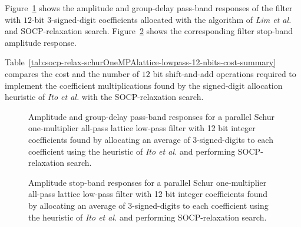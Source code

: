 \documentclass[a4paper,twoside,10pt,english]{report}
\begin{document}
Figure~\ref{fig:socp-relax-schurOneMPAlattice-lowpass-12-nbits-pass-response}
shows the amplitude and group-delay pass-band responses of the filter with
$12$-bit $3$-signed-digit coefficients allocated with the algorithm of
\emph{Lim et al.} and SOCP-relaxation search.
Figure~\ref{fig:socp-relax-schurOneMPAlattice-lowpass-12-nbits-stop-response}
shows the corresponding filter stop-band amplitude response.
\begin{comment}
Figure~\ref{fig:socp-relax-schurOneMPAlattice-lowpass-12-nbits-pz} shows the
filter pole-zero plot.
\end{comment}
Table~\ref{tab:socp-relax-schurOneMPAlattice-lowpass-12-nbits-cost-summary}
compares the cost and the number of $12$ bit shift-and-add operations required
to implement the coefficient multiplications found by the signed-digit
allocation heuristic of \emph{Ito et al.} with the SOCP-relaxation search.
\begin{figure}[!htbp]
\begin{center}
\scalebox{0.7}{}
\caption{Amplitude and group-delay pass-band responses for a parallel Schur
  one-multiplier all-pass lattice low-pass filter with 12 bit integer
  coefficients found by allocating an average of 3-signed-digits to each
  coefficient using the heuristic of \emph{Ito et al.} and performing
  SOCP-relaxation search.}
\label{fig:socp-relax-schurOneMPAlattice-lowpass-12-nbits-pass-response}
\end{center}
\end{figure}
\begin{figure}[!htbp]
\begin{center}
\scalebox{0.7}{}
\caption{Amplitude stop-band responses for a parallel Schur one-multiplier
  all-pass lattice low-pass filter with 12 bit integer coefficients found by
  allocating an average of 3-signed-digits to each coefficient using the
  heuristic of \emph{Ito et al.} and performing SOCP-relaxation search.}
\label{fig:socp-relax-schurOneMPAlattice-lowpass-12-nbits-stop-response}
\end{center}
\end{figure}
\begin{comment}
\begin{figure}[!htbp]
\begin{center}
\scalebox{0.7}{}
\caption{Pole-zero plot for a parallel Schur one-multiplier all-pass lattice
  low-pass filter with 12 bit integer coefficients found by allocating an
  average of 3 signed-digits to each coefficient using the heuristic of
  \emph{Ito et al.} and performing SOCP-relaxation search.}
\label{fig:socp-relax-schurOneMPAlattice-lowpass-12-nbits-pz}
\end{center}
\end{figure}
\end{comment}
\end{document}
